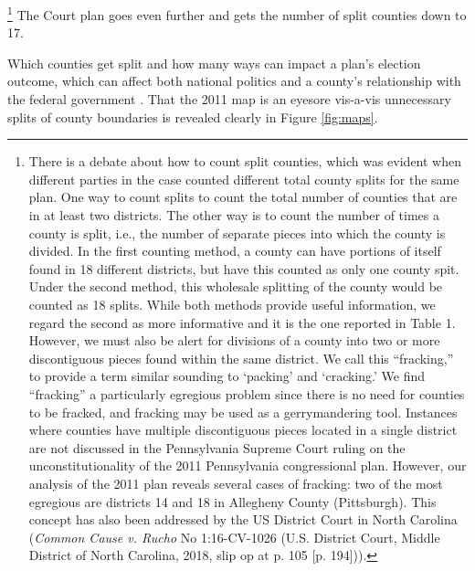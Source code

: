        \footnote{There is a debate about how to count split counties, which was evident when different parties in the case counted different total county splits for the same plan. One way to count splits to count the total number of counties that are in at least two districts. The other way is to count the number of times a county is split, i.e., the number of separate pieces into which the county is divided. In the first counting method, a county can have portions of itself found in 18 different districts, but have this counted as only one county spit. Under the second method, this wholesale splitting of the county would be counted as 18 splits. While both methods provide useful information, we regard the second as more informative and it is the one reported in Table 1. However, we must also be alert for divisions of a county into two or more discontiguous pieces found within the same district. We call this “fracking,” to provide a term similar sounding to ‘packing’ and ‘cracking.’ We find “fracking” a particularly egregious problem since there is no need for counties to be fracked, and fracking may be used as a gerrymandering tool.  Instances where counties  have multiple discontiguous pieces located in a single district are not discussed in the Pennsylvania Supreme Court ruling on the unconstitutionality of the 2011 Pennsylvania congressional plan. However, our analysis of the 2011 plan reveals several cases of fracking: two of the most egregious are districts 14 and 18 in Allegheny County (Pittsburgh). This concept has also been addressed by the US District Court in North Carolina (\textit{Common Cause v. Rucho} No 1:16-CV-1026 (U.S. District Court, Middle District of North Carolina, 2018, slip op at p. 105 [p. 194])). }
    The Court plan goes even further and gets the number of split counties down to 17. 
\par
    Which counties get split and how many ways can impact a plan’s election outcome, which can affect both national politics and a county's relationship with the federal government \citep{Ansolabehere2002a}. That the 2011 map is an eyesore vis-a-vis unnecessary splits of county boundaries is revealed clearly in Figure \ref{fig:maps}.
%

